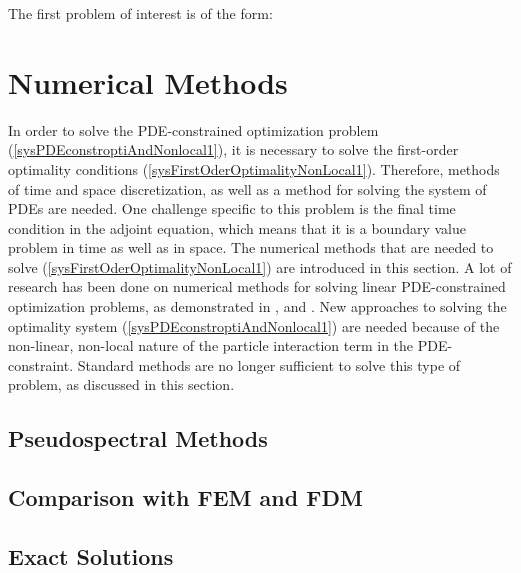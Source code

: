 \documentclass[11pt, a4paper]{article}
\theoremstyle{definition}
\begin{document}
The first problem of interest is of the form:


	

\section{Numerical Methods}	

In order to solve the PDE-constrained optimization problem (\ref{sysPDEconstroptiAndNonlocal1}), it is necessary to solve the first-order optimality conditions (\ref{sysFirstOderOptimalityNonLocal1}). Therefore, methods of time and space discretization, as well as a method for solving the system of PDEs are needed. One challenge specific to this problem is the final time condition in the adjoint equation, which means that it is a boundary value problem in time as well as in space. 	
The numerical methods that are needed to solve (\ref{sysFirstOderOptimalityNonLocal1}) are introduced in this section.
A lot of research has been done on numerical methods for solving linear PDE-constrained optimization problems, as demonstrated in \cite{DeLosReyesOptimization}, \cite{CarraroDirectIndirectMultipleShooting} and \cite{TroeltzschFredi2010OCoP}.
New approaches to solving the optimality system (\ref{sysPDEconstroptiAndNonlocal1}) are needed because of the non-linear, non-local nature of the particle interaction term in the PDE-constraint. Standard methods are no longer sufficient to solve this type of problem, as discussed in this section.

\subsection{Pseudospectral Methods} \label{secPSMTheory1}



\subsection{Comparison with FEM and FDM} \label{secCompareFEMFDMPDM}



\subsection{Exact Solutions} \label{secExactSolsDiffusion1}


\end{document}
